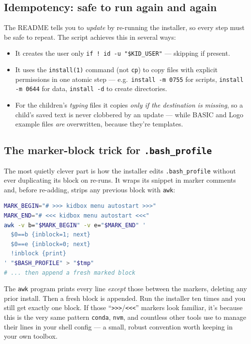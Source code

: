 \documentclass[11pt,oneside]{article}
\newcommand{\code}[1]{\texorpdfstring{\textcolor{kbblue}{\texttt{#1}}}{#1}}
\newcommand{\file}[1]{\textcolor{kbteal}{\texttt{#1}}}
\begin{document}
\subsection{Idempotency: safe to run again and again}

The README tells you to \emph{update} by re-running the installer, so every step
must be safe to repeat. The script achieves this in several ways:

\begin{itemize}
\item It creates the user only \code{if ! id -u "\$KID\_USER"} --- skipping if
present.
\item It uses the \texttt{install(1)} command (not \texttt{cp}) to copy files
with explicit permissions in one atomic step --- e.g.\ \code{install -m 0755} for
scripts, \code{install -m 0644} for data, \code{install -d} to create
directories.
\item For the children's \emph{typing} files it copies \emph{only if the
destination is missing}, so a child's saved text is never clobbered by an update
--- while BASIC and Logo example files \emph{are} overwritten, because they're
templates.
\end{itemize}

\subsection{The marker-block trick for \file{.bash\_profile}}

The most quietly clever part is how the installer edits \file{.bash\_profile}
without ever duplicating its block on re-runs. It wraps its snippet in marker
comments and, before re-adding, strips any previous block with \texttt{awk}:

\begin{lstlisting}[language=bash]
MARK_BEGIN="# >>> kidbox menu autostart >>>"
MARK_END="# <<< kidbox menu autostart <<<"
awk -v b="$MARK_BEGIN" -v e="$MARK_END" '
  $0==b {inblock=1; next}
  $0==e {inblock=0; next}
  !inblock {print}
' "$BASH_PROFILE" > "$tmp"
# ... then append a fresh marked block
\end{lstlisting}

The \texttt{awk} program prints every line \emph{except} those between the
markers, deleting any prior install. Then a fresh block is appended. Run the
installer ten times and you still get exactly one block. If those
``\code{>>>}/\code{<<<}'' markers look familiar, it's because this is the very
same pattern \texttt{conda}, \texttt{nvm}, and countless other tools use to manage
their lines in your shell config --- a small, robust convention worth keeping in
your own toolbox.
\end{document}
